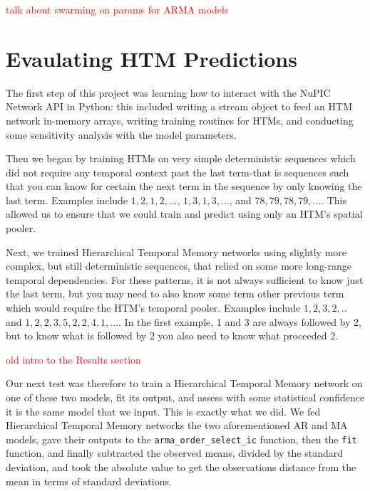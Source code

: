 \documentclass[oneside,12pt,openany]{book}
\begin{document}
	\textcolor{red}{talk about swarming on params for ARMA models}

    \vfill
    \pagebreak
    \vfill
    \pagebreak
    \vfill
    \pagebreak
    
    \section{Evaulating HTM Predictions}\label{sec:res:eval}
    
    The first step of this project was learning how to interact with the NuPIC Network API in Python: this included writing a stream object to feed an HTM network in-memory arrays, writing training routines for HTMs, and conducting some sensitivity analysis with the model parameters. 
    
    Then we began by training HTMs on very simple deterministic sequences which did not require any temporal context past the last term-that is sequences such that you can know for certain the next term in the sequence by only knowing the last term. Examples include $1,2,1,2,...$, $1,3,1,3,...$, and $78,79,78,79,...$. This allowed us to ensure that we could train and predict using only an HTM's spatial pooler.
    
    Next, we trained Hierarchical Temporal Memory networks using slightly more complex, but still deterministic sequences, that relied on some more long-range temporal dependencies. For these patterns, it is not always sufficient to know just the last term, but you may need to also know some term other previous term which would require the HTM's temporal pooler. Examples include $1,2,3,2,..$ and $1,2,2,3,5,2,2,4,1,...$. In the first example, 1 and 3 are always followed by 2, but to know what is followed by 2 you also need to know what proceeded 2.
    
    \textcolor{red}{old intro to the Results section }
	
	Our next test was therefore to train a Hierarchical Temporal Memory network on one of these two models, fit its output, and assess with some statistical confidence it is the same model that we input. This is exactly what we did. We fed Hierarchical Temporal Memory networks the two aforementioned AR and MA models, gave their outputs to the \texttt{arma\_order\_select\_ic} function, then the \texttt{fit} function, and finally subtracted the observed means, divided by the standard deviation, and took the absolute value to get the observations distance from the mean in terms of standard deviations. 
    
\end{document}
